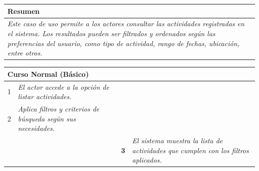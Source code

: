     \begin{table}[H]
        \begin{tabular}{llllllll}
        \hline
        \multicolumn{8}{|l|}{\cellcolor[HTML]{F2F2F2}Resumen}                                                                                                                                                                                                                                                                                                                                                                                             \\ \hline
        \multicolumn{8}{|p{15cm}|}{{\color[HTML]{808080} \textit{Este caso de uso permite a los actores consultar las actividades registradas en el sistema. Los resultados pueden ser filtrados y ordenados según las preferencias del usuario, como tipo de actividad, rango de fechas, ubicación, entre otros.}}} \\ \hline
        \end{tabular}
    \end{table}

    \begin{table}[H]
        \begin{tabular}{llllllll}
        \hline
        \multicolumn{8}{|l|}{\cellcolor[HTML]{F2F2F2}Curso Normal (Básico)}                                                                                                                                                                                                                                                                          \\ \hline
        \multicolumn{1}{|c|}{1}  & \multicolumn{1}{l|}{{\color[HTML]{808080} \textit{El actor accede a la opción de listar actividades.}}} & \multicolumn{1}{l|}{{\color[HTML]{808080} }}                    & \multicolumn{5}{l|}{{\color[HTML]{808080} }}                                                                                            \\ \hline
        \multicolumn{1}{|c|}{2}   & \multicolumn{1}{p{6cm}|}{{\color[HTML]{808080} \textit{Aplica filtros y criterios de búsqueda según sus necesidades.}}}                                                 & \multicolumn{1}{c|}{} & \multicolumn{5}{p{6cm}|}{{\color[HTML]{808080} \textit{}}}                         \\ \hline
        \multicolumn{1}{|l|}{}   & \multicolumn{1}{l|}{{\color[HTML]{808080} }}                                                          & \multicolumn{1}{l|}{{\color[HTML]{808080} \textbf{3}}}          & \multicolumn{5}{p{6cm}|}{{\color[HTML]{808080} \textit{El sistema muestra la lista de actividades que cumplen con los filtros aplicados.}}} \\ \hline
        \end{tabular}
    \end{table}

